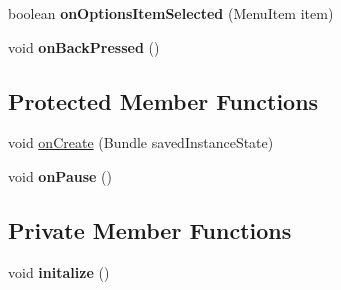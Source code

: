 \begin{DoxyCompactItemize}
\item 
boolean {\bfseries on\+Options\+Item\+Selected} (Menu\+Item item)\hypertarget{classcom_1_1example_1_1sebastian_1_1tindertp_1_1MatchingActivity_ab6f76188e481dbd4aedc4f61aba5617d}{}\label{classcom_1_1example_1_1sebastian_1_1tindertp_1_1MatchingActivity_ab6f76188e481dbd4aedc4f61aba5617d}

\item 
void {\bfseries on\+Back\+Pressed} ()\hypertarget{classcom_1_1example_1_1sebastian_1_1tindertp_1_1MatchingActivity_aae2f8e7d4392a25f7926383f8ca1f458}{}\label{classcom_1_1example_1_1sebastian_1_1tindertp_1_1MatchingActivity_aae2f8e7d4392a25f7926383f8ca1f458}

\end{DoxyCompactItemize}
\subsection*{Protected Member Functions}
\begin{DoxyCompactItemize}
\item 
void \hyperlink{classcom_1_1example_1_1sebastian_1_1tindertp_1_1MatchingActivity_aef2b068e4e7e5c39e1314cc07fc2e7aa}{on\+Create} (Bundle saved\+Instance\+State)
\item 
void {\bfseries on\+Pause} ()\hypertarget{classcom_1_1example_1_1sebastian_1_1tindertp_1_1MatchingActivity_a463af85190b18a901cc02f924819fdde}{}\label{classcom_1_1example_1_1sebastian_1_1tindertp_1_1MatchingActivity_a463af85190b18a901cc02f924819fdde}

\end{DoxyCompactItemize}
\subsection*{Private Member Functions}
\begin{DoxyCompactItemize}
\item 
void {\bfseries initalize} ()\hypertarget{classcom_1_1example_1_1sebastian_1_1tindertp_1_1MatchingActivity_ac03020d0d0f199d8cec821fa16955e2c}{}\label{classcom_1_1example_1_1sebastian_1_1tindertp_1_1MatchingActivity_ac03020d0d0f199d8cec821fa16955e2c}

\end{DoxyCompactItemize}
